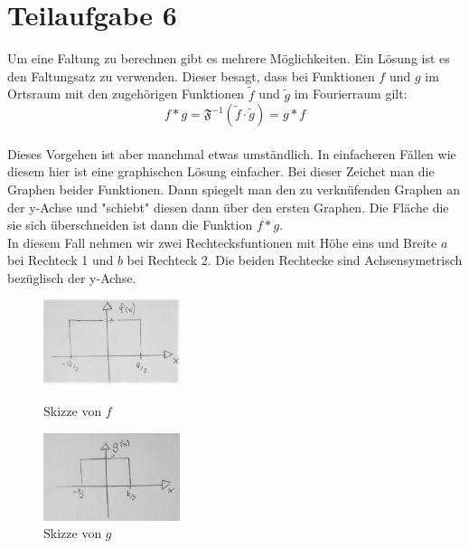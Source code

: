 

\section{Teilaufgabe 6}

Um eine Faltung zu berechnen gibt es mehrere Möglichkeiten. Ein Lösung ist es den Faltungsatz zu verwenden. Dieser besagt, dass bei Funktionen $f$ und $g$ im Ortsraum mit den 
zugehörigen Funktionen $\tilde{f}$ und $\tilde{g}$ im Fourierraum gilt:
\begin{equation}  \label{faltungssatz}
    f\ast g = \mathfrak{F}^{-1}(\tilde{f} \cdot \tilde{g}  ) = g \ast f
\end{equation}\\
Dieses Vorgehen ist aber manchmal etwas umständlich. In einfacheren Fällen wie diesem hier ist eine graphischen Lösung einfacher. 
Bei dieser Zeichet man die Graphen beider Funktionen. Dann spiegelt man den zu verknüfenden Graphen an der y-Achse und "schiebt" diesen dann über den ersten Graphen. 
Die Fläche die sie sich überschneiden ist dann die Funktion $f \ast g $.\\
In diesem Fall nehmen wir zwei Rechtecksfuntionen mit Höhe eins und Breite $a$ bei Rechteck 1 und $b$ bei Rechteck 2. Die beiden Rechtecke sind Achsensymetrisch bezüglisch der y-Achse.
\begin{figure}[htb]
    \centering
        \begin{minipage}[t]{0.45\linewidth}
            \centering
            \includegraphics[width=4cm]{Bilder/FzV/frage6_1.jpg}
            \caption{Skizze von $f$}
        \end{minipage}
        \hfill
        \begin{minipage}[t]{0.45\linewidth}
            \centering
            \includegraphics[width=4cm]{Bilder/FzV/frage6_2.jpg}
            \caption{Skizze von $g$}
        \end{minipage}
   
    
\end{figure}
